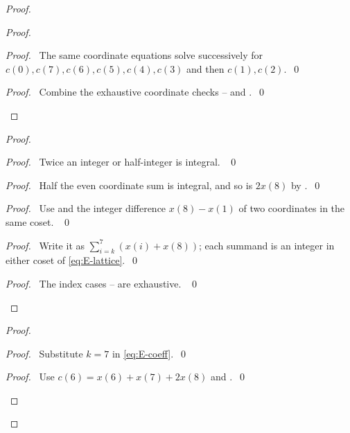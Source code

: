 \begin{proof}
\begin{proof}
\begin{proof}\pf\ The same coordinate equations solve successively for
$c(0),c(7),c(6),c(5),c(4),c(3)$ and then $c(1),c(2)$.~\qed\end{proof}
\qedstep
\begin{proof}\pf\ Combine the exhaustive coordinate checks
-- and .~\qed\end{proof}
\end{proof}
\begin{proof}
\begin{proof}\pf\ Twice an integer or half-integer is integral. ~\qed\end{proof}
\begin{proof}\pf\ Half the even coordinate sum is integral, and so is
$2x(8)$ by .~\qed\end{proof}
\begin{proof}\pf\ Use  and the integer difference
$x(8)-x(1)$ of two coordinates in the same coset. ~\qed\end{proof}
\begin{proof}\pf\ Write it as $\sum_{i=k}^7(x(i)+x(8))$;
each summand is an integer in either coset of \eqref{eq:E-lattice}.~\qed\end{proof}
\qedstep
\begin{proof}\pf\ The index cases --
are exhaustive. ~\qed\end{proof}
\end{proof}
\begin{proof}
\begin{proof}\pf\ Substitute $k=7$ in \eqref{eq:E-coeff}.~\qed\end{proof}
\begin{proof}\pf\ Use $c(6)=x(6)+x(7)+2x(8)$ and
.~\qed\end{proof}

\end{proof}
\end{proof}
